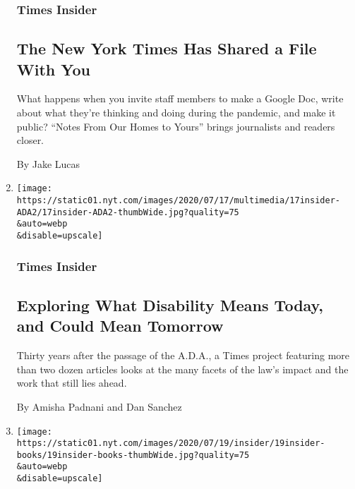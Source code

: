 \begin{enumerate}
  \hypertarget{times-insider-7}{%
  \subsubsection{Times Insider}\label{times-insider-7}}

  \hypertarget{the-new-york-times-has-shared-a-file-with-you}{%
  \subsection{The New York Times Has Shared a File With
  You}\label{the-new-york-times-has-shared-a-file-with-you}}

  What happens when you invite staff members to make a Google Doc, write
  about what they're thinking and doing during the pandemic, and make it
  public? ``Notes From Our Homes to Yours'' brings journalists and
  readers closer.

  By Jake Lucas
\item
  \href{/2020/07/20/insider/disability-ADA.html}{}

  \texttt{[image: https://static01.nyt.com/images/2020/07/17/multimedia/17insider-ADA2/17insider-ADA2-thumbWide.jpg?quality=75\\\&auto=webp\\\&disable=upscale]}

  \hypertarget{times-insider-8}{%
  \subsubsection{Times Insider}\label{times-insider-8}}

  \hypertarget{exploring-what-disability-means-today-and-could-mean-tomorrow}{%
  \subsection{Exploring What Disability Means Today, and Could Mean
  Tomorrow}\label{exploring-what-disability-means-today-and-could-mean-tomorrow}}

  Thirty years after the passage of the A.D.A., a Times project
  featuring more than two dozen articles looks at the many facets of the
  law's impact and the work that still lies ahead.

  By Amisha Padnani and Dan Sanchez
\item
  \href{/2020/07/19/insider/times-book-review-remote.html}{}

  \texttt{[image: https://static01.nyt.com/images/2020/07/19/insider/19insider-books/19insider-books-thumbWide.jpg?quality=75\\\&auto=webp\\\&disable=upscale]}


\end{enumerate}
